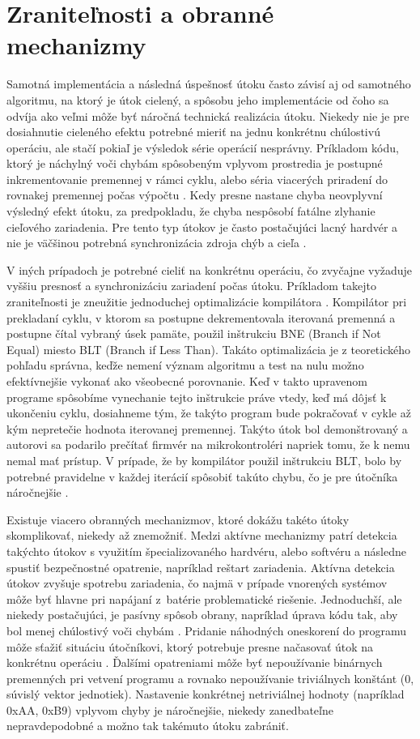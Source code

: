 \section{Zranite\v{l}nosti a obranné mechanizmy} \label{kap1:sek:zranitelnostiAMechanizmy}
Samotná implementácia a následná úspešnosť útoku často závisí aj od samotného algoritmu, na ktorý je útok cielený, a spôsobu jeho implementácie od čoho sa odvíja ako veľmi môže byť náročná technická realizácia útoku. Niekedy nie je pre dosiahnutie cieleného efektu potrebné mieriť na jednu konkrétnu chúlostivú operáciu, ale stačí pokiaľ je výsledok série operácií nesprávny. Príkladom kódu, ktorý je náchylný voči chybám spôsobeným vplyvom prostredia je postupné inkrementovanie premennej v rámci cyklu, alebo séria viacerých priradení do rovnakej premennej počas výpočtu \cite{crowbars}. Kedy presne nastane chyba neovplyvní výsledný efekt útoku, za predpokladu, že chyba nespôsobí fatálne zlyhanie cieľového zariadenia. Pre tento typ útokov je často postačujúci lacný hardvér a nie je väčšinou potrebná synchronizácia zdroja chýb a cieľa \cite{crowbars, vccOnTheCheap}.

V iných prípadoch je potrebné cieliť na konkrétnu operáciu, čo zvyčajne vyžaduje vyššiu presnosť a synchronizáciu zariadení počas útoku. Príkladom takejto zraniteľnosti je zneužitie jednoduchej optimalizácie kompilátora \cite{AntiFI}. Kompilátor pri prekladaní cyklu, v ktorom sa postupne dekrementovala iterovaná premenná a postupne čítal vybraný úsek pamäte, použil inštrukciu BNE (Branch if Not Equal) miesto BLT (Branch if Less Than). Takáto optimalizácia je z teoretického pohľadu správna, keďže nemení význam algoritmu a test na nulu možno efektívnejšie vykonať ako všeobecné porovnanie. Keď v takto upravenom programe spôsobíme vynechanie tejto inštrukcie práve vtedy, keď má dôjsť k ukončeniu cyklu, dosiahneme tým, že takýto program bude pokračovať v cykle až kým nepretečie hodnota iterovanej premennej. Takýto útok bol demonštrovaný a autorovi sa podarilo prečítať firmvér na mikrokontroléri napriek tomu, že k nemu nemal mať prístup. V prípade, že by kompilátor použil inštrukciu BLT, bolo by potrebné pravidelne v každej iterácií spôsobiť takúto chybu, čo je pre útočníka náročnejšie \cite{AntiFI}.

Existuje viacero obranných mechanizmov, ktoré dokážu takéto útoky skomplikovať, niekedy až znemožniť. Medzi aktívne mechanizmy patrí detekcia takýchto útokov s využitím špecializovaného hardvéru, alebo softvéru a následne spustiť bezpečnostné opatrenie, napríklad reštart zariadenia. Aktívna detekcia útokov zvyšuje spotrebu zariadenia, čo najmä v prípade vnorených systémov môže byť hlavne pri napájaní z~batérie problematické riešenie. Jednoduchší, ale niekedy postačujúci, je pasívny spôsob obrany, napríklad úprava kódu tak, aby bol menej chúlostivý voči chybám \cite{AntiFI}. Pridanie náhodných oneskorení do programu môže sťažiť situáciu útočníkovi, ktorý potrebuje presne načasovať útok na konkrétnu operáciu \cite{AntiFI}. Ďalšími opatreniami môže byť nepoužívanie binárnych premenných pri vetvení programu a rovnako nepoužívanie triviálnych konštánt (0, súvislý vektor jednotiek). Nastavenie konkrétnej netriviálnej hodnoty (napríklad 0xAA, 0xB9) vplyvom chyby je náročnejšie, niekedy zanedbateľne nepravdepodobné a možno tak takémuto útoku zabrániť.